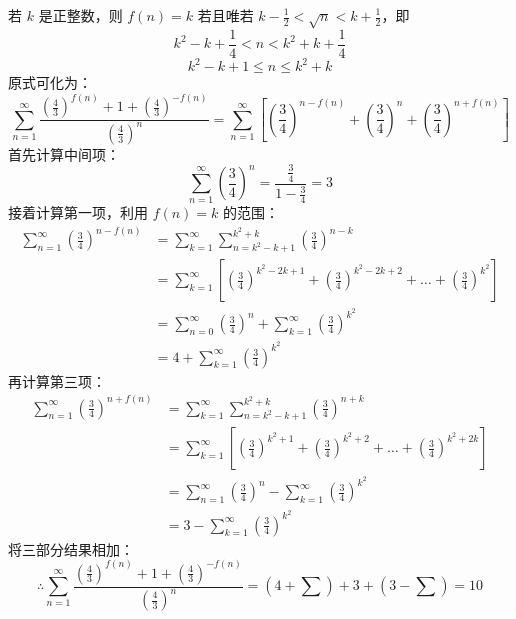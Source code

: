 \begin{questions}
\begin{solution}
若 $k$ 是正整数，则 $f(n)=k$ 若且唯若 $k-\frac{1}{2} < \sqrt{n} < k+\frac{1}{2}$，即
\[
k^2 - k + \frac{1}{4} < n < k^2 + k + \frac{1}{4}
\]
\[
k^2 - k + 1 \le n \le k^2 + k
\]
原式可化为：
\[
\sum_{n=1}^{\infty} \frac{\left( \frac{4}{3} \right)^{f(n)} + 1 + \left( \frac{4}{3} \right)^{-f(n)}}{\left( \frac{4}{3} \right)^{n}} = \sum_{n=1}^{\infty} \left[ \left( \frac{3}{4} \right)^{n-f(n)} + \left( \frac{3}{4} \right)^{n} + \left( \frac{3}{4} \right)^{n+f(n)} \right]
\]
首先计算中间项：
\[
\sum_{n=1}^{\infty} \left( \frac{3}{4} \right)^{n} = \frac{\frac{3}{4}}{1 - \frac{3}{4}} = 3
\]
接着计算第一项，利用 $f(n)=k$ 的范围：
\begin{align*}
\sum_{n=1}^{\infty} \left( \frac{3}{4} \right)^{n-f(n)} &= \sum_{k=1}^{\infty} \sum_{n=k^2-k+1}^{k^2+k} \left( \frac{3}{4} \right)^{n-k} \\
&= \sum_{k=1}^{\infty} \left[ \left( \frac{3}{4} \right)^{k^2-2k+1} + \left( \frac{3}{4} \right)^{k^2-2k+2} + \dots + \left( \frac{3}{4} \right)^{k^2} \right] \\
&= \sum_{n=0}^{\infty} \left( \frac{3}{4} \right)^{n} + \sum_{k=1}^{\infty} \left( \frac{3}{4} \right)^{k^2} \\
&= 4 + \sum_{k=1}^{\infty} \left( \frac{3}{4} \right)^{k^2}
\end{align*}
再计算第三项：
\begin{align*}
\sum_{n=1}^{\infty} \left( \frac{3}{4} \right)^{n+f(n)} &= \sum_{k=1}^{\infty} \sum_{n=k^2-k+1}^{k^2+k} \left( \frac{3}{4} \right)^{n+k} \\
&= \sum_{k=1}^{\infty} \left[ \left( \frac{3}{4} \right)^{k^2+1} + \left( \frac{3}{4} \right)^{k^2+2} + \dots + \left( \frac{3}{4} \right)^{k^2+2k} \right] \\
&= \sum_{n=1}^{\infty} \left( \frac{3}{4} \right)^{n} - \sum_{k=1}^{\infty} \left( \frac{3}{4} \right)^{k^2} \\
&= 3 - \sum_{k=1}^{\infty} \left( \frac{3}{4} \right)^{k^2}
\end{align*}
将三部分结果相加：
\[
\therefore \sum_{n=1}^{\infty} \frac{\left( \frac{4}{3} \right)^{f(n)} + 1 + \left( \frac{4}{3} \right)^{-f(n)}}{\left( \frac{4}{3} \right)^{n}} = \left( 4 + \sum \right) + 3 + \left( 3 - \sum \right) = 10
\]
\end{solution}


\end{questions}
